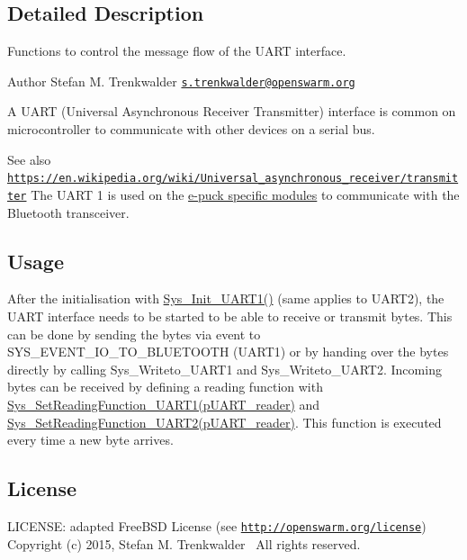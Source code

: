\subsection{Detailed Description}
Functions to control the message flow of the U\+A\+R\+T interface. 

\begin{DoxyAuthor}{Author}
Stefan M. Trenkwalder \href{mailto:s.trenkwalder@openswarm.org}{\tt s.\+trenkwalder@openswarm.\+org}
\end{DoxyAuthor}
A U\+A\+R\+T (Universal Asynchronous Receiver Transmitter) interface is common on microcontroller to communicate with other devices on a serial bus. \begin{DoxySeeAlso}{See also}
\href{https://en.wikipedia.org/wiki/Universal_asynchronous_receiver/transmitter}{\tt https\+://en.\+wikipedia.\+org/wiki/\+Universal\+\_\+asynchronous\+\_\+receiver/transmitter} The U\+A\+R\+T 1 is used on the \hyperlink{group__epuck}{e-\/puck specific modules} to communicate with the Bluetooth transceiver.
\end{DoxySeeAlso}
\hypertarget{group__uart_uart_usage}{}\subsection{Usage}\label{group__uart_uart_usage}
After the initialisation with \hyperlink{uart_8h_a64689486ee92e3dcd519778bc7afd3de}{Sys\+\_\+\+Init\+\_\+\+U\+A\+R\+T1()} (same applies to U\+A\+R\+T2), the U\+A\+R\+T interface needs to be started to be able to receive or transmit bytes. This can be done by sending the bytes via event to S\+Y\+S\+\_\+\+E\+V\+E\+N\+T\+\_\+\+I\+O\+\_\+\+T\+O\+\_\+\+B\+L\+U\+E\+T\+O\+O\+T\+H (U\+A\+R\+T1) or by handing over the bytes directly by calling Sys\+\_\+\+Writeto\+\_\+\+U\+A\+R\+T1 and Sys\+\_\+\+Writeto\+\_\+\+U\+A\+R\+T2. Incoming bytes can be received by defining a reading function with \hyperlink{uart_8h_a09b6e9f0a90b382e5bb453035ca337af}{Sys\+\_\+\+Set\+Reading\+Function\+\_\+\+U\+A\+R\+T1(p\+U\+A\+R\+T\+\_\+reader)} and \hyperlink{uart_8h_a9fad382ce87c7296fe5ba2005d0a7b10}{Sys\+\_\+\+Set\+Reading\+Function\+\_\+\+U\+A\+R\+T2(p\+U\+A\+R\+T\+\_\+reader)}. This function is executed every time a new byte arrives.\hypertarget{group__uart_uart_license}{}\subsection{License}\label{group__uart_uart_license}
L\+I\+C\+E\+N\+S\+E\+: adapted Free\+B\+S\+D License (see \href{http://openswarm.org/license}{\tt http\+://openswarm.\+org/license})~\newline
Copyright (c) 2015, Stefan M. Trenkwalder~\newline
All rights reserved. 